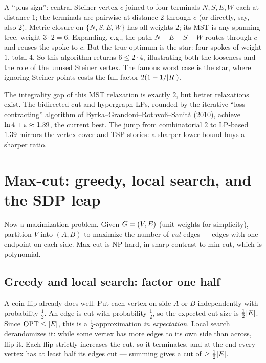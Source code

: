\begin{labbox}
A ``plus sign'': central Steiner vertex $c$ joined to four terminals $N,S,E,W$ each at distance $1$;
the terminals are pairwise at distance $2$ through $c$ (or directly, say, also $2$). Metric closure on
$\{N,S,E,W\}$ has all weights $2$; its MST is any spanning tree, weight $3\cdot 2 = 6$. Expanding,
e.g., the path $N\!-\!E\!-\!S\!-\!W$ routes through $c$ and reuses the spoke to $c$. But the true
optimum is the star: four spokes of weight $1$, total $4$. So this algorithm returns $6 \le 2\cdot 4$,
illustrating both the looseness and the role of the unused Steiner vertex. The famous worst case is
the star, where ignoring Steiner points costs the full factor $2(1-1/\lvert R\rvert)$.
\end{labbox}

\begin{connectionbox}
The integrality gap of this MST relaxation is exactly $2$, but better relaxations exist. The
bidirected-cut and hypergraph LPs, rounded by the iterative ``loss-contracting'' algorithm of
Byrka--Grandoni--Rothvo\ss--Sanit\`a (2010), achieve $\ln 4 + \varepsilon \approx 1.39$, the current best.
The jump from combinatorial $2$ to LP-based $1.39$ mirrors the vertex-cover and TSP stories: a sharper
lower bound buys a sharper ratio.
\end{connectionbox}

\section{Max-cut: greedy, local search, and the SDP leap}

Now a maximization problem. Given $G=(V,E)$ (unit weights for simplicity), partition $V$ into
$(A,B)$ to maximize the number of \emph{cut} edges --- edges with one endpoint on each side. Max-cut
is \textsf{NP}-hard, in sharp contrast to min-cut, which is polynomial.

\subsection{Greedy and local search: factor one half}

\begin{intuitionbox}
A coin flip already does well. Put each vertex on side $A$ or $B$ independently with probability
$\tfrac12$. An edge is cut with probability $\tfrac12$, so the expected cut size is $\tfrac12\lvert E\rvert$.
Since $\mathrm{OPT}\le\lvert E\rvert$, this is a $\tfrac12$-approximation \emph{in expectation}. Local search
derandomizes it: while some vertex has more edges to its own side than across, flip it. Each flip
strictly increases the cut, so it terminates, and at the end every vertex has at least half its edges
cut --- summing gives a cut of $\ge\tfrac12\lvert E\rvert$.
\end{intuitionbox}

